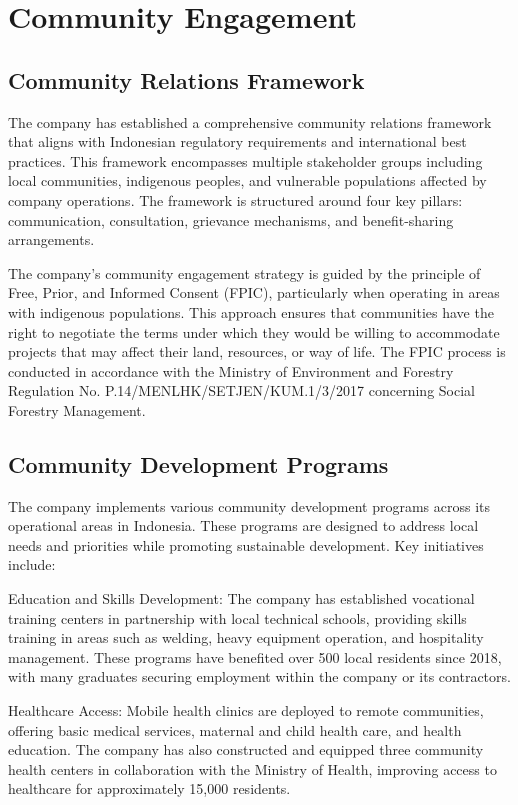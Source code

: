 \section{Community Engagement}

\subsection{Community Relations Framework}

The company has established a comprehensive community relations framework that aligns with Indonesian regulatory requirements and international best practices. This framework encompasses multiple stakeholder groups including local communities, indigenous peoples, and vulnerable populations affected by company operations. The framework is structured around four key pillars: communication, consultation, grievance mechanisms, and benefit-sharing arrangements.

The company's community engagement strategy is guided by the principle of Free, Prior, and Informed Consent (FPIC), particularly when operating in areas with indigenous populations. This approach ensures that communities have the right to negotiate the terms under which they would be willing to accommodate projects that may affect their land, resources, or way of life. The FPIC process is conducted in accordance with the Ministry of Environment and Forestry Regulation No. P.14/MENLHK/SETJEN/KUM.1/3/2017 concerning Social Forestry Management.

\subsection{Community Development Programs}

The company implements various community development programs across its operational areas in Indonesia. These programs are designed to address local needs and priorities while promoting sustainable development. Key initiatives include:

Education and Skills Development: The company has established vocational training centers in partnership with local technical schools, providing skills training in areas such as welding, heavy equipment operation, and hospitality management. These programs have benefited over 500 local residents since 2018, with many graduates securing employment within the company or its contractors.

Healthcare Access: Mobile health clinics are deployed to remote communities, offering basic medical services, maternal and child health care, and health education. The company has also constructed and equipped three community health centers in collaboration with the Ministry of Health, improving access to healthcare for approximately 15,000 residents.

